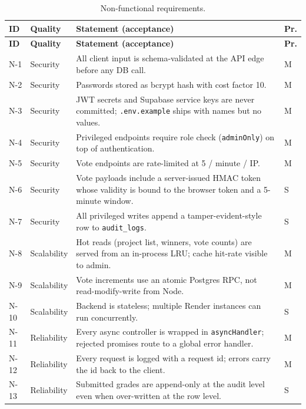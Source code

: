 \begin{longtable}{p{}p{}p{}p{}}
  \caption{Non-functional requirements.}\label{tab:nonfunc-req}\\
  \toprule
  \textbf{ID} & \textbf{Quality} & \textbf{Statement (acceptance)} & \textbf{Pr.} \\
  \midrule
  \endfirsthead
  \toprule
  \textbf{ID} & \textbf{Quality} & \textbf{Statement (acceptance)} & \textbf{Pr.} \\
  \midrule
  \endhead

  N-1  & Security      & All client input is schema-validated at the API edge before any DB call. & M \\
  N-2  & Security      & Passwords stored as bcrypt hash with cost factor 10. & M \\
  N-3  & Security      & JWT secrets and Supabase service keys are never committed; \texttt{.env.example} ships with names but no values. & M \\
  N-4  & Security      & Privileged endpoints require role check (\texttt{adminOnly}) on top of authentication. & M \\
  N-5  & Security      & Vote endpoints are rate-limited at 5 / minute / IP. & M \\
  N-6  & Security      & Vote payloads include a server-issued HMAC token whose validity is bound to the browser token and a 5-minute window. & S \\
  N-7  & Security      & All privileged writes append a tamper-evident-style row to \texttt{audit\_logs}. & S \\
  N-8  & Scalability   & Hot reads (project list, winners, vote counts) are served from an in-process LRU; cache hit-rate visible to admin. & M \\
  N-9  & Scalability   & Vote increments use an atomic Postgres RPC, not read-modify-write from Node. & M \\
  N-10 & Scalability   & Backend is stateless; multiple Render instances can run concurrently. & S \\
  N-11 & Reliability   & Every async controller is wrapped in \texttt{asyncHandler}; rejected promises route to a global error handler. & M \\
  N-12 & Reliability   & Every request is logged with a request id; errors carry the id back to the client. & M \\
  N-13 & Reliability   & Submitted grades are append-only at the audit level even when over-written at the row level. & S \\

\end{longtable}
